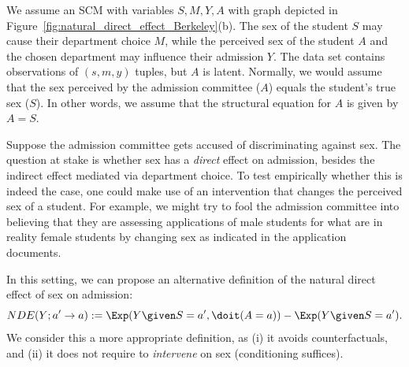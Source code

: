 We assume an SCM with variables $S,M,Y,A$ with graph depicted in Figure~\ref{fig:natural_direct_effect_Berkeley}(b).
The sex of the student $S$ may cause their department choice $M$, while the perceived sex of the student $A$ and the chosen department may influence their admission $Y$. 
The data set contains observations of $(s,m,y)$ tuples, but $A$ is latent.
Normally, we would assume that the sex perceived by the admission committee ($A$) equals the student's true sex ($S$).
In other words, we assume that the structural equation for $A$ is given by $A = S$.

Suppose the admission committee gets accused of discriminating against sex.
The question at stake is whether sex has a \emph{direct} effect on admission, besides the indirect effect mediated via department choice.
To test empirically whether this is indeed the case, one could make use of an intervention that changes the perceived sex of a student.
For example, we might try to fool the admission committee into believing that they are assessing
applications of male students for what are in reality female students by changing sex as indicated in the application documents.

In this setting, we can propose an alternative definition of the natural direct effect of sex on admission:
\begin{equation}\label{eq:nde_interventional}
 NDE(Y; a' \to a) := \Exp(Y \given S=a', \doit(A=a)) - \Exp(Y \given S=a').
\end{equation}
We consider this a more appropriate definition, as (i) it avoids counterfactuals, and
(ii) it does not require to \emph{intervene} on sex (conditioning suffices).


